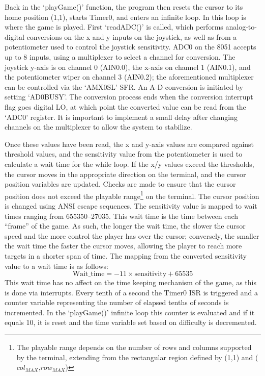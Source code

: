 \documentclass[12pt]{article}
\begin{document}
Back in the `playGame()' function, the program then resets the cursor to its home position (1,1), starts Timer0, and enters an infinite loop. In this loop is where the game is played. First `readADC()' is called, which performs analog-to-digital conversions on the x and y inputs on the joystick, as well as from a potentiometer used to control the joystick sensitivity. ADC0 on the 8051 accepts up to 8 inputs, using a multiplexer to select a channel for conversion. The joystick y-axis is on channel 0 (AIN0.0), the x-axis on channel 1 (AIN0.1), and the potentiometer wiper on channel 3 (AIN0.2); the aforementioned multiplexer can be controlled via the `AMX0SL' SFR. An A-D conversion is initiated by setting `AD0BUSY'. The conversion process ends when the conversion interrupt flag goes digital LO, at which point the converted value can be read from the `ADC0' register. It is important to implement a small delay after changing channels on the multiplexer to allow the system to stabilize. 

Once these values have been read, the x and y-axis values are compared against threshold values, and the sensitivity value from the potentiometer is used to calculate a wait time for the while loop. If the x/y values exceed the thresholds, the cursor moves in the appropriate direction on the terminal, and the cursor position variables are updated. Checks are made to ensure that the cursor position does not exceed the playable range\footnote{The playable range depends on the number of rows and columns supported by the terminal, extending from the rectangular region defined by (1,1) and ($col_{MAX}$,$row_{MAX}$)} on the terminal. The cursor position is changed using ANSI escape sequences. The sensitivity value is mapped to wait times ranging from 655350--27035. This wait time is the time between each ``frame'' of the game. As such, the longer the wait time, the slower the cursor speed and the more control the player has over the cursor; conversely, the smaller the wait time the faster the cursor moves, allowing the player to reach more targets in a shorter span of time. The mapping from the converted sensitivity value to a wait time is as follows: 
\begin{displaymath}
	\mathrm{Wait\_time}=-11\times \mathrm{sensitivity}+65535
\end{displaymath}
This wait time has no affect on the time keeping mechanism of the game, as this is done via interrupts. Every tenth of a second the Timer0 ISR is triggered and a counter variable representing the number of elapsed tenths of seconds is incremented. In the `playGame()' infinite loop this counter is evaluated and if it equals 10, it is reset and the time variable set based on difficulty is decremented. 
\end{document}
